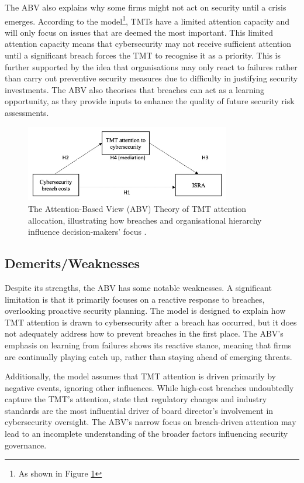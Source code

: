     The ABV also explains why some firms might not act on security until a crisis emerges. According to the model\footnote{As shown in Figure \ref{fig:ABV}}, TMTs have a limited attention capacity and will only focus on issues that are deemed the most important. This limited attention capacity means that cybersecurity may not receive sufficient attention until a significant breach forces the TMT to recognise it as a priority. This is further supported by the idea that organisations may only react to failures rather than carry out preventive security measures due to difficulty in justifying security investments. The ABV also theorises that breaches can act as a learning opportunity, as they provide inputs to enhance the quality of future security risk assessments.

    \begin{figure}[htbp]
        \centering
        \includegraphics[width=0.8\textwidth]{figures/ABV-Theory.png}
        \caption{The Attention-Based View (ABV) Theory of TMT attention allocation, illustrating how breaches and organisational hierarchy influence decision-makers' focus \citep{shaikh2023information}.}
        \label{fig:ABV}
    \end{figure}

    \subsection{Demerits/Weaknesses}
    Despite its strengths, the ABV has some notable weaknesses. A significant limitation is that it primarily focuses on a reactive response to breaches, overlooking proactive security planning. The model is designed to explain how TMT attention is drawn to cybersecurity after a breach has occurred, but it does not adequately address how to prevent breaches in the first place. The ABV's emphasis on learning from failures shows its reactive stance, meaning that firms are continually playing catch up, rather than staying ahead of emerging threats.

    Additionally, the model assumes that TMT attention is driven primarily by negative events, ignoring other influences. While high-cost breaches undoubtedly capture the TMT's attention, \citet{gale2022governing} state that regulatory changes and industry standards are the most influential driver of board director's involvement in cybersecurity oversight. The ABV's narrow focus on breach-driven attention may lead to an incomplete understanding of the broader factors influencing security governance.

